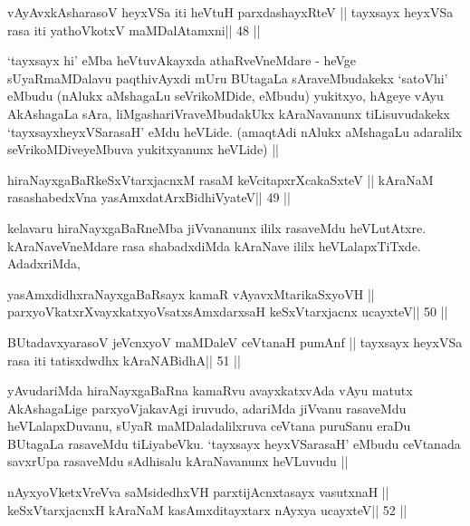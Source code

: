 \begin{shl}
vAyAvxkAsharasoV heyxVSa iti heVtuH parxdashayxRteV ||
tayxsayx heyxVSa rasa iti yathoVkotxV maMDalAtamxni\hfill || 48 ||
\end{shl}

\begin{artha}
`tayxsayx hi' eMba heVtuvAkayxda athaRveVneMdare - heVge
sUyaRmaMDalavu paqthivAyxdi mUru BUtagaLa sAraveMbudakekx `satoVhi'
eMbudu (nAlukx aMshagaLu seVrikoMDide, eMbudu) yukitxyo, hAgeye vAyu
AkAshagaLa sAra, liMgashariVraveMbudakUkx kAraNavanunx tiLisuvudakekx
`tayxsayxheyxVSarasaH' eMdu heVLide. (amaqtAdi nAlukx aMshagaLu
adaralilx seVrikoMDiveyeMbuva yukitxyanunx heVLide) ||
\end{artha}



\begin{shl}
hiraNayxgaBaRkeSxVtarxjacnxM rasaM keVcitapxrXcakaSxteV ||
kAraNaM rasashabedxVna yasAmxdatArxBidhiVyateV\hfill || 49 ||
\end{shl}

\begin{artha}
kelavaru hiraNayxgaBaRneMba jiVvananunx ililx rasaveMdu
heVLutAtxre. kAraNaveVneMdare rasa shabadxdiMda kAraNave ililx
heVLalapxTiTxde. AdadxriMda, 
\end{artha}


\begin{shl}
yasAmxdidhxraNayxgaBaRsayx kamaR vAyavxMtarikaSxyoVH ||
parxyoVkatxrXvayxkatxyoVsatxsAmxdarxsaH keSxVtarxjacnx ucayxteV\hfill || 50 ||
\end{shl}

\begin{shl}
BUtadavxyarasoV jeVcnxyoV maMDaleV ceVtanaH pumAnf ||
tayxsayx heyxVSa rasa iti tatisxdwdhx kAraNABidhA\hfill || 51 ||
\end{shl}

\begin{artha}
yAvudariMda hiraNayxgaBaRna kamaRvu avayxkatxvAda vAyu matutx
AkAshagaLige parxyoVjakavAgi iruvudo, adariMda jiVvanu rasaveMdu
heVLalapxDuvanu, sUyaR maMDaladalilxruva ceVtana puruSanu eraDu
BUtagaLa rasaveMdu tiLiyabeVku. `tayxsayx heyxVSarasaH' eMbudu
ceVtanada savxrUpa rasaveMdu sAdhisalu kAraNavanunx heVLuvudu ||
\end{artha}

\begin{shl}
nAyxyoVketxVreVva saMsidedhxVH parxtijAcnxtasayx vasutxnaH ||
keSxVtarxjacnxH kAraNaM kasAmxditayxtarx nAyxya ucayxteV\hfill || 52 ||
\end{shl}


